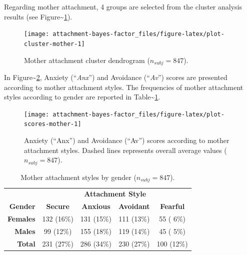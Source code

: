 \documentclass[
]{book}
\begin{document}
Regarding mother attachment, 4 groups are selected from the cluster analysis results (see Figure\textasciitilde\ref{fig:plot-cluster-mother}).

\begin{figure}

{\centering \texttt{[image: attachment-bayes-factor\_files/figure-latex/plot-cluster-mother-1]} 

}

\caption{Mother attachment cluster dendrogram ($n_{subj} = 847$).}\label{fig:plot-cluster-mother}
\end{figure}

In Figure\textasciitilde\ref{fig:plot-scores-mother}, Anxiety (``\emph{Anx}'') and Avoidance (``\emph{Av}'') scores are presented according to mother attachment styles. The frequencies of mother attachment styles according to gender are reported in Table\textasciitilde\ref{tab:table-cluster-mother}.

\begin{figure}

{\centering \texttt{[image: attachment-bayes-factor\_files/figure-latex/plot-scores-mother-1]} 

}

\caption{Anxiety (“Anx”) and Avoidance (“Av”) scores according to mother attachment styles. Dashed lines represents overall average values ($n_{subj} = 847$).}\label{fig:plot-scores-mother}
\end{figure}

\begin{table}[!h]

\caption{\label{tab:table-cluster-mother}Mother attachment styles by gender ($n_{subj} = 847$).}
\centering
\begin{tabular}[t]{>{}rcccc}
\toprule
\multicolumn{1}{c}{\textbf{ }} & \multicolumn{4}{c}{\textbf{Attachment Style}} \\
\cmidrule(l{3pt}r{3pt}){2-5}
\textbf{Gender} & \textbf{Secure} & \textbf{Anxious} & \textbf{Avoidant} & \textbf{Fearful}\\
\midrule
\textbf{Females} & 132 (16\%) & 131 (15\%) & 111 (13\%) & 55 ( 6\%)\\
\textbf{Males} & 99 (12\%) & 155 (18\%) & 119 (14\%) & 45 ( 5\%)\\
\textbf{Total} & 231 (27\%) & 286 (34\%) & 230 (27\%) & 100 (12\%)\\
\bottomrule
\end{tabular}
\end{table}
\end{document}
